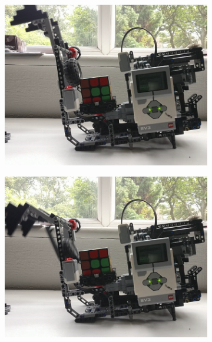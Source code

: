 \documentclass{report}
\begin{document}
	\begin{figure}[H]
		\centering
		\begin{subfigure}[b]{0.25\textwidth}
			\includegraphics[width=\textwidth]{Resources/Images/imgMkIArmCollapse1.png}
		\end{subfigure}
		\hspace{5mm}
		\begin{subfigure}[b]{0.25\textwidth}
			\includegraphics[width=\textwidth]{Resources/Images/imgMkIArmCollapse2.png}
		\end{subfigure}
		\hspace{5mm}
		\begin{subfigure}[b]{0.25\textwidth}

\end{subfigure}
\end{figure}
\end{document}
